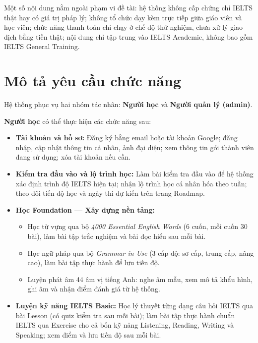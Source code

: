 Một số nội dung nằm ngoài phạm vi đề tài: hệ thống không cấp chứng chỉ IELTS thật hay có giá trị pháp lý; không tổ chức dạy kèm trực tiếp giữa giáo viên và học viên; chức năng thanh toán chỉ chạy ở chế độ thử nghiệm, chưa xử lý giao dịch bằng tiền thật; nội dung chỉ tập trung vào IELTS Academic, không bao gồm IELTS General Training.

\section{Mô tả yêu cầu chức năng}

Hệ thống phục vụ hai nhóm tác nhân: \textbf{Người học} và \textbf{Người quản lý (admin)}.

\textbf{Người học} có thể thực hiện các chức năng sau:

\begin{itemize}
    \item \textbf{Tài khoản và hồ sơ:} Đăng ký bằng email hoặc tài khoản Google; đăng nhập, cập nhật thông tin cá nhân, ảnh đại diện; xem thông tin gói thành viên đang sử dụng; xóa tài khoản nếu cần.

    \item \textbf{Kiểm tra đầu vào và lộ trình học:} Làm bài kiểm tra đầu vào để hệ thống xác định trình độ IELTS hiện tại; nhận lộ trình học cá nhân hóa theo tuần; theo dõi tiến độ học và ngày thi dự kiến trên trang Roadmap.

    \item \textbf{Học Foundation --- Xây dựng nền tảng:}
    \begin{itemize}
        \item Học từ vựng qua bộ \textit{4000 Essential English Words} (6 cuốn, mỗi cuốn 30 bài), làm bài tập trắc nghiệm và bài đọc hiểu sau mỗi bài.
        \item Học ngữ pháp qua bộ \textit{Grammar in Use} (3 cấp độ: sơ cấp, trung cấp, nâng cao), làm bài tập thực hành để lưu tiến độ.
        \item Luyện phát âm 44 âm vị tiếng Anh: nghe âm mẫu, xem mô tả khẩu hình, ghi âm và nhận điểm đánh giá từ hệ thống.
    \end{itemize}

    \item \textbf{Luyện kỹ năng IELTS Basic:} Học lý thuyết từng dạng câu hỏi IELTS qua bài Lesson (có quiz kiểm tra sau mỗi bài); làm bài tập thực hành chuẩn IELTS qua Exercise cho cả bốn kỹ năng Listening, Reading, Writing và Speaking; xem điểm và lưu tiến độ sau mỗi bài.


\end{itemize}
